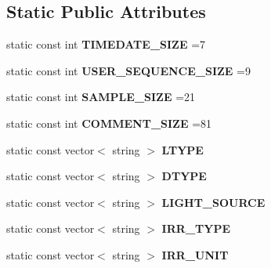 \subsection*{Static Public Attributes}
\begin{DoxyCompactItemize}
\item 
\hypertarget{classData_a6fc19df2521dfe5d739d6018b15326a3}{static const int {\bfseries T\-I\-M\-E\-D\-A\-T\-E\-\_\-\-S\-I\-Z\-E} =7}\label{classData_a6fc19df2521dfe5d739d6018b15326a3}

\item 
\hypertarget{classData_ac275d6a042ec7a06585702d43c8fbbca}{static const int {\bfseries U\-S\-E\-R\-\_\-\-S\-E\-Q\-U\-E\-N\-C\-E\-\_\-\-S\-I\-Z\-E} =9}\label{classData_ac275d6a042ec7a06585702d43c8fbbca}

\item 
\hypertarget{classData_a993296133daa1260f863fe67d9fac401}{static const int {\bfseries S\-A\-M\-P\-L\-E\-\_\-\-S\-I\-Z\-E} =21}\label{classData_a993296133daa1260f863fe67d9fac401}

\item 
\hypertarget{classData_a69d0299f85e7437d4f450122174a0259}{static const int {\bfseries C\-O\-M\-M\-E\-N\-T\-\_\-\-S\-I\-Z\-E} =81}\label{classData_a69d0299f85e7437d4f450122174a0259}

\item 
\hypertarget{classData_adb9405a86ea64e5a9b2ef2620db26ba7}{static const vector$<$ string $>$ {\bfseries L\-T\-Y\-P\-E}}\label{classData_adb9405a86ea64e5a9b2ef2620db26ba7}

\item 
\hypertarget{classData_ad74ba79472bc888594476cab4a7ace58}{static const vector$<$ string $>$ {\bfseries D\-T\-Y\-P\-E}}\label{classData_ad74ba79472bc888594476cab4a7ace58}

\item 
\hypertarget{classData_a51c7d7f85301f929304f813d92ce8669}{static const vector$<$ string $>$ {\bfseries L\-I\-G\-H\-T\-\_\-\-S\-O\-U\-R\-C\-E}}\label{classData_a51c7d7f85301f929304f813d92ce8669}

\item 
\hypertarget{classData_ac85a75fe45681718c87b323e9a898147}{static const vector$<$ string $>$ {\bfseries I\-R\-R\-\_\-\-T\-Y\-P\-E}}\label{classData_ac85a75fe45681718c87b323e9a898147}

\item 
\hypertarget{classData_a2139a4b080e0178ebe95cba97a185ac3}{static const vector$<$ string $>$ {\bfseries I\-R\-R\-\_\-\-U\-N\-I\-T}}\label{classData_a2139a4b080e0178ebe95cba97a185ac3}


\end{DoxyCompactItemize}
